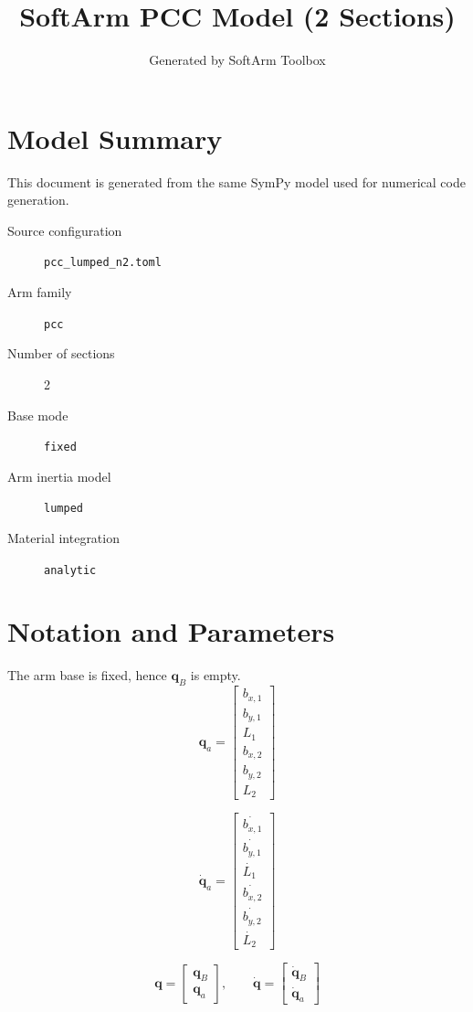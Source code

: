 \documentclass[11pt]{article}
\title{SoftArm PCC Model (2 Sections)}
\author{Generated by SoftArm Toolbox}
\date{}
\begin{document}
\maketitle

\section{Model Summary}
This document is generated from the same SymPy model used for numerical code generation.
\begin{description}
\item[Source configuration] \texttt{pcc\_lumped\_n2.toml}
\item[Arm family] \texttt{pcc}
\item[Number of sections] 2
\item[Base mode] \texttt{fixed}
\item[Arm inertia model] \texttt{lumped}
\item[Material integration] \texttt{analytic}
\end{description}

\section{Notation and Parameters}
The arm base is fixed, hence $\boldsymbol q_B$ is empty.
\begin{equation}
\boldsymbol q_a=\begin{bmatrix}b_{x,1}\\b_{y,1}\\L_{1}\\b_{x,2}\\b_{y,2}\\L_{2}\end{bmatrix}
\end{equation}

\begin{equation}
\dot{\boldsymbol q}_a=\begin{bmatrix}\dot{b_{x,1}}\\\dot{b_{y,1}}\\\dot{L_{1}}\\\dot{b_{x,2}}\\\dot{b_{y,2}}\\\dot{L_{2}}\end{bmatrix}
\end{equation}

\begin{equation}
\boldsymbol q=\begin{bmatrix}\boldsymbol q_B\\\boldsymbol q_a\end{bmatrix},\qquad \dot{\boldsymbol q}=\begin{bmatrix}\dot{\boldsymbol q}_B\\\dot{\boldsymbol q}_a\end{bmatrix}
\end{equation}
\end{document}
